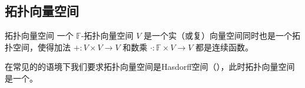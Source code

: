 
\subsection{拓扑向量空间}

\begin{definition}{拓扑向量空间}
一个 $\mathbb{F}$-拓扑向量空间 $V$ 是一个实（或复）向量空间同时也是一个拓扑空间，使得加法 $+: V \times V \to V$ 和数乘 $\cdot: \mathbb{F} \times V \to V$ 都是连续函数。

在常见的的语境下我们要求拓扑向量空间是Hasdorff空间（），此时拓扑向量空间是一个。
\end{definition}

